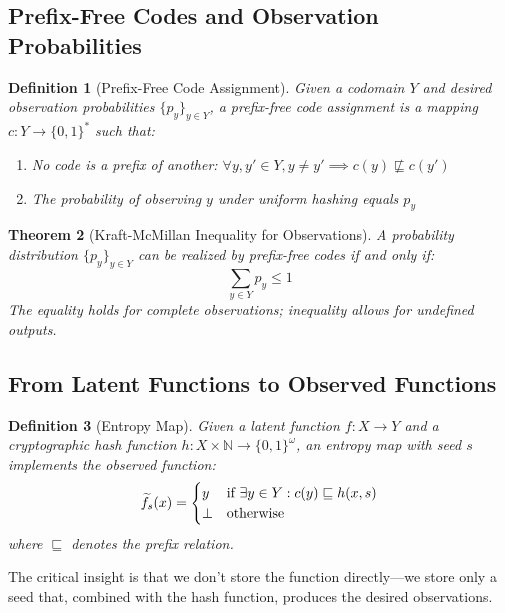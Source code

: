 \documentclass[11pt,final,hidelinks]{article}
\newtheorem{theorem}{Theorem}[section]
\newtheorem{definition}[theorem]{Definition}
\begin{document}
\subsection{Prefix-Free Codes and Observation Probabilities}

\begin{definition}[Prefix-Free Code Assignment]
Given a codomain $Y$ and desired observation probabilities $\{p_y\}_{y \in Y}$, a prefix-free code assignment is a mapping $c: Y \to \{0,1\}^*$ such that:
\begin{enumerate}
    \item No code is a prefix of another: $\forall y, y' \in Y, y \neq y' \implies c(y) \not\sqsubseteq c(y')$
    \item The probability of observing $y$ under uniform hashing equals $p_y$
\end{enumerate}
\end{definition}

\begin{theorem}[Kraft-McMillan Inequality for Observations]
A probability distribution $\{p_y\}_{y \in Y}$ can be realized by prefix-free codes if and only if:
\begin{equation}
\sum_{y \in Y} p_y \leq 1
\end{equation}
The equality holds for complete observations; inequality allows for undefined outputs.
\end{theorem}

\subsection{From Latent Functions to Observed Functions}

\begin{definition}[Entropy Map]
Given a latent function $f: X \to Y$ and a cryptographic hash function $h: X \times \mathbb{N} \to \{0,1\}^\omega$, an entropy map with seed $s$ implements the observed function:
\begin{equation}
\widetilde{f}_s(x) = \begin{cases}
y & \text{if } \exists y \in Y: c(y) \sqsubseteq h(x, s) \\
\bot & \text{otherwise}
\end{cases}
\end{equation}
where $\sqsubseteq$ denotes the prefix relation.
\end{definition}

The critical insight is that we don't store the function directly—we store only a seed that, combined with the hash function, produces the desired observations.
\end{document}

